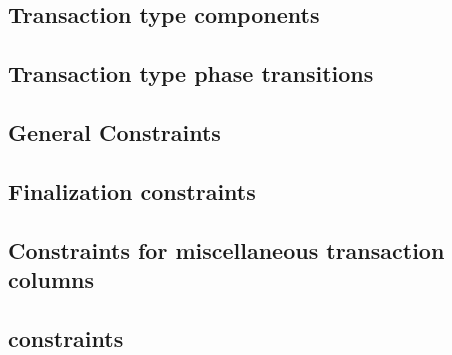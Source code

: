 \subsection{Transaction type \rlp{} components}                   \label{rlp txn v2: generalities: transaction type rlp components}    
\subsection{Transaction type phase transitions}                   \label{rlp txn v2: generalities: admissible rlp component flags}     
\subsection{General Constraints}                                  \label{rlp txn v2: generalities: indices and limb constructed}       
\subsection{Finalization constraints}                             \label{rlp txn v2: generalities: heartbeat}                          
\subsection{Constraints for miscellaneous transaction columns}    \label{rlp txn v2: generalities: miscellaneous txn columns}          
\subsection{ constraints}       \label{rlp txn v2: generalities: TMP k column generalities}          
